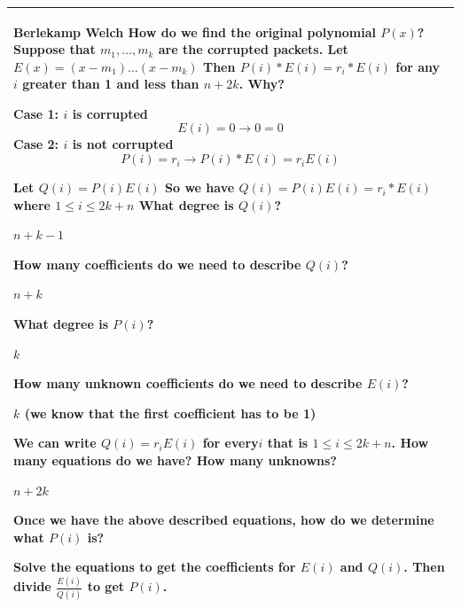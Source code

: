 \clearpage
{\tabulinesep=1mm
\begin{tabu}{|p{16cm} |}
\hline
\textbf{Berlekamp Welch} \newline
How do we find the original polynomial $P(x)$? \newline
Suppose that $m_1, \dotsc, m_k$ are the corrupted packets. Let $E(x) = (x - m_1) \dotsc (x - m_k)$
Then $P(i) * E(i) = r_i * E(i)$ for any $i$ greater than 1 and less than $n + 2k$. Why?
\begin{solution}[5 cm]
	Case 1: $i$ is corrupted
\[E(i) = 0 \rightarrow 0 = 0\]
			Case 2: $i$ is not corrupted
				\[P(i) = r_i \rightarrow P(i) * E(i) = r_i E(i)\]
\end{solution}

Let $Q(i) = P(i) E(i)$
So we have $Q(i)= P(i) E(i) = r_i * E(i)$ where $1 \leq i \leq 2k + n$
What degree is $Q(i)$? 
\begin{solution}[1 cm]
$n + k - 1$
\end{solution}

How many coefficients do we need to describe $Q(i)$? 
\begin{solution}[1 cm]
$n + k$
\end{solution}

What degree is $P(i)$? 
\begin{solution}[1 cm]
$k$
\end{solution}

How many unknown coefficients do we need to describe $E(i)$? 
\begin{solution}[2 cm]
$k$ (we know that the first coefficient has to be 1)
\end{solution}

We can write $Q(i) = r_i E(i)$ for every$ i$ that is $1 \leq i \leq 2k + n$. \newline
How many equations do we have? How many unknowns? 
\begin{solution}[1 cm]
$n + 2k$
\end{solution}

Once we have the above described equations, how do we determine what 
$P(i)$ is?
\begin{solution}[3 cm]
Solve the equations to get the coefficients for $E(i)$ and $Q(i)$. 
Then divide $\frac{E(i)}{Q(i)}$ to get $P(i)$.
\end{solution}
\\
\hline
\end{tabu}
}

